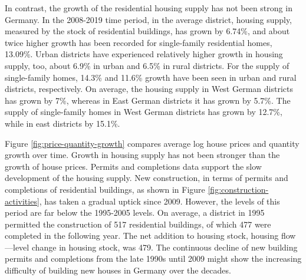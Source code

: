 \documentclass[
  12pt,
]{article}
\begin{document}
In contrast, the growth of the residential housing supply has not been strong in Germany. In the 2008-2019 time period, in the average district, housing supply, measured by the stock of residential buildings, has grown by 6.74\%, and about twice higher growth has been recorded for single-family residential homes, 13.09\%. Urban districts have experienced relatively higher growth in housing supply, too, about 6.9\% in urban and 6.5\% in rural districts. For the supply of single-family homes, 14.3\% and 11.6\% growth have been seen in urban and rural districts, respectively. On average, the housing supply in West German districts has grown by 7\%, whereas in East German districts it has grown by 5.7\%. The supply of single-family homes in West German districts has grown by 12.7\%, while in east districts by 15.1\%.

Figure \ref{fig:price-quantity-growth} compares average log house prices and quantity growth over time. Growth in housing supply has not been stronger than the growth of house prices. Permits and completions data support the slow development of the housing supply. New construction, in terms of permits and completions of residential buildings, as shown in Figure \ref{fig:construction-activities}, has taken a gradual uptick since 2009. However, the levels of this period are far below the 1995-2005 levels. On average, a district in 1995 permitted the construction of 517 residential buildings, of which 477 were completed in the following year. The net addition to housing stock, housing flow---level change in housing stock, was 479. The continuous decline of new building permits and completions from the late 1990s until 2009 might show the increasing difficulty of building new houses in Germany over the decades.
\end{document}
